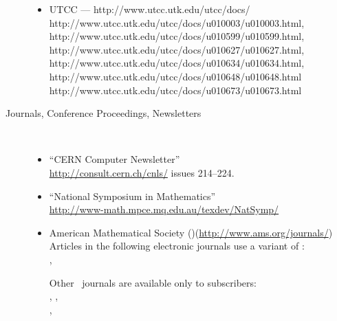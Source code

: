 \begin{description}
\begin{itemize}
\item
UTCC --- %
{http://www.utcc.utk.edu/utcc/docs/}\\
%
{http://www.utcc.utk.edu/utcc/docs/u010003/u010003.html}, 
{http://www.utcc.utk.edu/utcc/docs/u010599/u010599.html},
{http://www.utcc.utk.edu/utcc/docs/u010627/u010627.html},
{http://www.utcc.utk.edu/utcc/docs/u010634/u010634.html},
{http://www.utcc.utk.edu/utcc/docs/u010648/u010648.html}\\
{http://www.utcc.utk.edu/utcc/docs/u010673/u010673.html}
\html{\smallskip}%


\end{itemize}


\htmlrule[50\% center]


\item [Journals, Conference Proceedings, Newsletters]~%
\begin{itemize}
%
\item ``CERN Computer Newsletter''\\
\url{http://consult.cern.ch/cnls/} issues 214--224.
\html{\smallskip}%

\item ``National Symposium in Mathematics''\\
\url{http://www-math.mpce.mq.edu.au/texdev/NatSymp/}
\html{\smallskip}

\item
American Mathematical Society (\AmS)\quad(\url{http://www.ams.org/journals/})\\
Articles in the following electronic journals use a variant of \latextohtml{}:\\
, 
\\ 

\smallskip
Other \AmS\ journals are available only to subscribers:\\
, 
,
\\
, 


\end{itemize}
\end{description}
